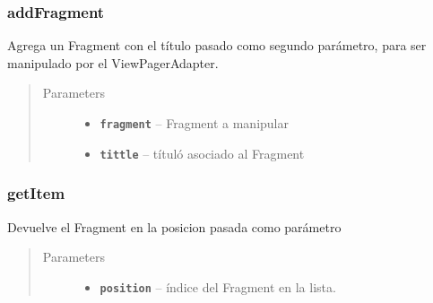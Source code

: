 \documentclass[letterpaper,10pt,english]{sphinxmanual}
\begin{document}
\subsubsection{addFragment}
\label{Adapter/ViewPagerAdapter:addfragment}

\begin{fulllineitems}
\label{Adapter/ViewPagerAdapter:com.fiuba.tallerii.jobify.ViewPagerAdapter.addFragment(Fragment, String)}
Agrega un Fragment con el título pasado como segundo parámetro, para ser manipulado por el ViewPagerAdapter.
\begin{quote}\begin{description}
\item[{Parameters}] \leavevmode\begin{itemize}
\item {} 
\textbf{\texttt{fragment}} -- Fragment a manipular

\item {} 
\textbf{\texttt{tittle}} -- títuló asociado al Fragment

\end{itemize}

\end{description}\end{quote}

\end{fulllineitems}



\subsubsection{getItem}
\label{Adapter/ViewPagerAdapter:getitem}

\begin{fulllineitems}
\label{Adapter/ViewPagerAdapter:com.fiuba.tallerii.jobify.ViewPagerAdapter.getItem(int)}
Devuelve el Fragment en la posicion pasada como parámetro
\begin{quote}\begin{description}
\item[{Parameters}] \leavevmode\begin{itemize}
\item {} 
\textbf{\texttt{position}} -- índice del Fragment en la lista.

\end{itemize}

\end{description}\end{quote}

\end{fulllineitems}
\end{document}
